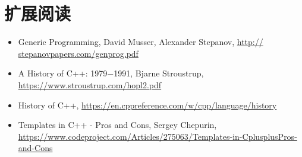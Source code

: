 \section{扩展阅读}
\begin{itemize}
  \item Generic Programming, David Musser, Alexander Stepanov, \url{http:// stepanovpapers.com/genprog.pdf}
  \item A History of C++: 1979−1991, Bjarne Stroustrup, \url{https://www.stroustrup.com/hopl2.pdf}
  \item History of C++, \url{https://en.cppreference.com/w/cpp/language/history}
  \item Templates in C++ - Pros and Cons, Sergey Chepurin, \url{https://www.codeproject.com/Articles/275063/Templates-in-CplusplusPros-and-Cons}
\end{itemize}